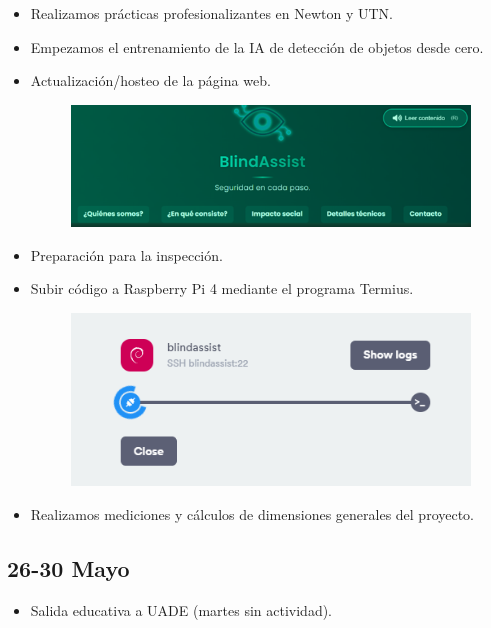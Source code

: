 \documentclass[12pt,a4paper]{article}
\begin{document}
\begin{itemize}
\item Realizamos prácticas profesionalizantes en Newton y UTN.
\item Empezamos el entrenamiento de la IA de detección de objetos desde cero.
\item Actualización/hosteo de la página web.
\begin{figure}[H]
\includegraphics[width=\linewidth]{Carpeta de campo/Imagen10.png}
\end{figure}
\item Preparación para la inspección.



\item Subir código a Raspberry Pi 4 mediante el programa Termius.
\begin{figure}[H]
    \centering
    \includegraphics[width=0.75\linewidth]{Carpeta de campo/Subir a Termius.png}
\end{figure}
\item Realizamos mediciones y cálculos de dimensiones generales del proyecto.

\end{itemize}

\subsection*{26-30 Mayo}

\begin{itemize}

\item Salida educativa a UADE (martes sin actividad).
\end{itemize}
\end{document}
